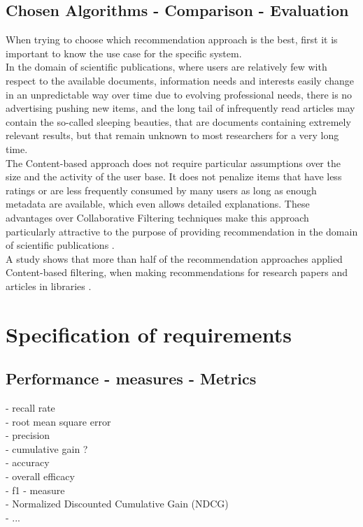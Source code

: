 \documentclass[\myFontSize,oneside,english,hidelinks,a4paper]{article}
\begin{document}
\subsection{Chosen Algorithms - Comparison - Evaluation}
When trying to choose which recommendation approach is the best, first it is important to know the use case for the specific system. \\
%
In the domain of scientific publications, where users are relatively few with respect to the available documents, information needs and interests easily change in an unpredictable way over time due to evolving professional needs, there is no advertising pushing new items, and the long tail of infrequently read articles may contain the so-called sleeping beauties, that are documents containing extremely relevant results, but that remain unknown to most researchers for a very long time. \\
The Content-based approach does not require particular assumptions over the size and the activity of the user base. It does not penalize items that have less ratings or are less frequently consumed by many users as long as enough metadata are available, which even allows detailed explanations. These advantages over Collaborative Filtering techniques make this approach particularly attractive to the purpose of providing recommendation in the domain of scientific publications \cite{De_Nart201484}. \\
%
A study shows that more than half of the recommendation approaches applied Content-based filtering, when making recommendations for research papers and articles in libraries \cite{Beel2016305}. \\
%








\clearpage
\section{Specification of requirements}

\subsection{Performance - measures - Metrics}
- recall rate\\
- root mean square error\\
- precision\\
- cumulative gain ?\\
- accuracy\\
- overall efficacy\\
- f1 - measure\\
- Normalized Discounted Cumulative Gain (NDCG)\\
- ...\\
\end{document}
